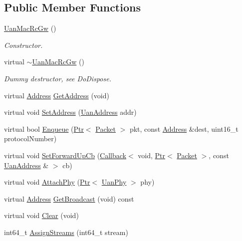 \subsection*{Public Member Functions}
\begin{DoxyCompactItemize}
\item 
\hyperlink{classns3_1_1UanMacRcGw_a299426e341f023ae7bde2f62e4269d90}{Uan\+Mac\+Rc\+Gw} ()
\begin{DoxyCompactList}\small\item\em Constructor. \end{DoxyCompactList}\item 
virtual \hyperlink{classns3_1_1UanMacRcGw_aff7f4df704b98f65567e0dc8b054460d}{$\sim$\+Uan\+Mac\+Rc\+Gw} ()
\begin{DoxyCompactList}\small\item\em Dummy destructor, see Do\+Dispose. \end{DoxyCompactList}\item 
virtual \hyperlink{classns3_1_1Address}{Address} \hyperlink{classns3_1_1UanMacRcGw_adeefc04b015d9a518a11781a6a32bbc3}{Get\+Address} (void)
\item 
virtual void \hyperlink{classns3_1_1UanMacRcGw_a5a66b56d33e9ecc8ab197abde6b79756}{Set\+Address} (\hyperlink{classns3_1_1UanAddress}{Uan\+Address} addr)
\item 
virtual bool \hyperlink{classns3_1_1UanMacRcGw_a5887fee6477de597ba3fa6b7b19f3862}{Enqueue} (\hyperlink{classns3_1_1Ptr}{Ptr}$<$ \hyperlink{classns3_1_1Packet}{Packet} $>$ pkt, const \hyperlink{classns3_1_1Address}{Address} \&dest, uint16\+\_\+t protocol\+Number)
\item 
virtual void \hyperlink{classns3_1_1UanMacRcGw_a2f708f0a914ec5ca0897ddfb8653b881}{Set\+Forward\+Up\+Cb} (\hyperlink{classns3_1_1Callback}{Callback}$<$ void, \hyperlink{classns3_1_1Ptr}{Ptr}$<$ \hyperlink{classns3_1_1Packet}{Packet} $>$, const \hyperlink{classns3_1_1UanAddress}{Uan\+Address} \& $>$ cb)
\item 
virtual void \hyperlink{classns3_1_1UanMacRcGw_ae1467bc739ab7ac0dc9f1d1cef3bb55a}{Attach\+Phy} (\hyperlink{classns3_1_1Ptr}{Ptr}$<$ \hyperlink{classns3_1_1UanPhy}{Uan\+Phy} $>$ phy)
\item 
virtual \hyperlink{classns3_1_1Address}{Address} \hyperlink{classns3_1_1UanMacRcGw_ad197e94cc1ce4910264f838fc600241c}{Get\+Broadcast} (void) const 
\item 
virtual void \hyperlink{classns3_1_1UanMacRcGw_a1b55372d9c1a92d9e95cf6dcabf9719b}{Clear} (void)
\item 
int64\+\_\+t \hyperlink{classns3_1_1UanMacRcGw_a491f7f510855411f0a7efd6f5f0c2bd1}{Assign\+Streams} (int64\+\_\+t stream)
\end{DoxyCompactItemize}
